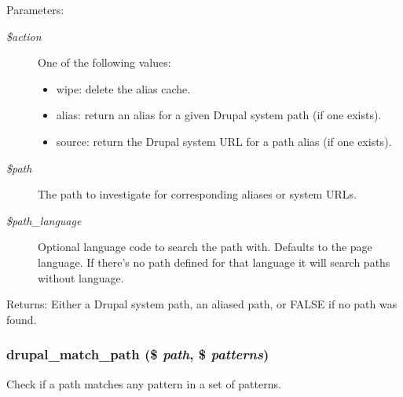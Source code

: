 \begin{Desc}
\item[Parameters:]
\begin{description}
\item[{\em \$action}]One of the following values:\begin{itemize}
\item wipe: delete the alias cache.\item alias: return an alias for a given Drupal system path (if one exists).\item source: return the Drupal system URL for a path alias (if one exists). \end{itemize}
\item[{\em \$path}]The path to investigate for corresponding aliases or system URLs. \item[{\em \$path\_\-language}]Optional language code to search the path with. Defaults to the page language. If there's no path defined for that language it will search paths without language.\end{description}
\end{Desc}
\begin{Desc}
\item[Returns:]Either a Drupal system path, an aliased path, or FALSE if no path was found. \end{Desc}
\hypertarget{path_8inc_1299e390360982cc8fbebe06f0232e18}{
\subsubsection[{drupal\_\-match\_\-path}]{\setlength{\rightskip}{0pt plus 5cm}drupal\_\-match\_\-path (\$ {\em path}, \/  \$ {\em patterns})}}
\label{path_8inc_1299e390360982cc8fbebe06f0232e18}


Check if a path matches any pattern in a set of patterns.

